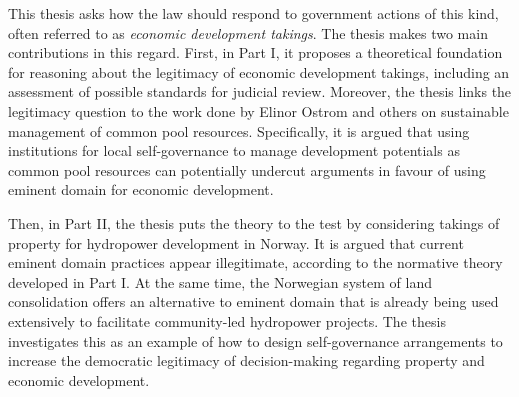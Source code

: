 \begin{quoting}
This thesis asks how the law should respond to government actions of this kind, often referred to as {\it economic development takings}. The thesis makes two main contributions in this regard. First, in Part I, it proposes a theoretical foundation for reasoning about the legitimacy of economic development takings, including an assessment of possible standards for judicial review. Moreover, the thesis links the legitimacy question to the work done by Elinor Ostrom and others on sustainable management of common pool resources. Specifically, it is argued that using institutions for local self-governance to manage development potentials as common pool resources can potentially undercut arguments in favour of using eminent domain for economic development.

Then, in Part II, the thesis puts the theory to the test by considering takings of property for hydropower development in Norway. It is argued that current eminent domain practices appear illegitimate, according to the normative theory developed in Part I. At the same time, the Norwegian system of land consolidation offers an alternative to eminent domain that is already being used extensively to facilitate community-led hydropower projects. The thesis investigates this as an example of how to design self-governance arrangements to increase the democratic legitimacy of decision-making regarding property and economic development.





\end{quoting}
